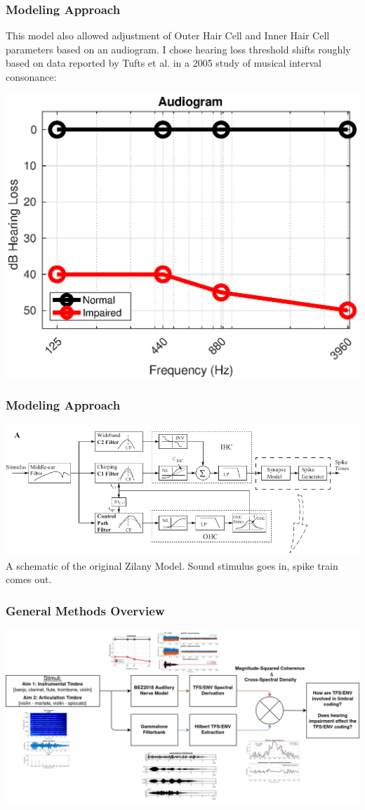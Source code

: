 \documentclass[aspectratio=1610]{beamer}
\begin{document}
\begin{frame}
\frametitle{Modeling Approach}
This model also allowed adjustment of Outer Hair Cell and Inner Hair Cell parameters based on an audiogram. I chose hearing loss threshold shifts roughly based on data reported by Tufts et al. in a 2005 study of musical interval consonance:\vspace{1em} 

\centering
\includegraphics[width = .6\textwidth]{audiogram} 

\end{frame}

\begin{frame}
\frametitle{Modeling Approach}


\centering

\includegraphics[width = 1\textwidth]{bruce} \vspace{1em} 
A schematic of the original Zilany Model. Sound stimulus goes in, spike train comes out. 

\end{frame}

\begin{frame}
\frametitle{General Methods Overview}


\centering

\includegraphics[height = .77\textheight]{methods_pics} \vspace{1em} 


\end{frame}
\end{document}
